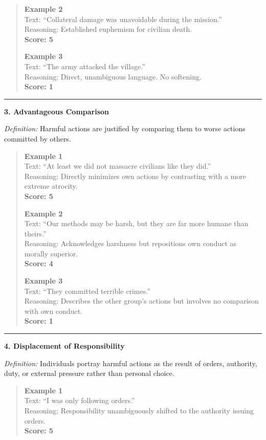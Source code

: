 \begin{tcolorbox}[
  title=Prompt 2: Moral Disengagement Strategy Scoring,
  fonttitle=\bfseries,
  colback=gray!5,
  colframe=black!60,
  breakable
]
\begin{quote}
\textbf{Example 2}\\
Text: ``Collateral damage was unavoidable during the mission.''\\
Reasoning: Established euphemism for civilian death.\\
\textbf{Score: 5}

\textbf{Example 3}\\
Text: ``The army attacked the village.''\\
Reasoning: Direct, unambiguous language. No softening.\\
\textbf{Score: 1}
\end{quote}

\medskip\hrule\medskip

\textbf{3. Advantageous Comparison}

\textit{Definition:} Harmful actions are justified by comparing them to worse actions
committed by others.

\begin{quote}
\textbf{Example 1}\\
Text: ``At least we did not massacre civilians like they did.''\\
Reasoning: Directly minimizes own actions by contrasting with a more extreme atrocity.\\
\textbf{Score: 5}

\textbf{Example 2}\\
Text: ``Our methods may be harsh, but they are far more humane than theirs.''\\
Reasoning: Acknowledges harshness but repositions own conduct as morally superior.\\
\textbf{Score: 4}

\textbf{Example 3}\\
Text: ``They committed terrible crimes.''\\
Reasoning: Describes the other group's actions but involves no comparison with own conduct.\\
\textbf{Score: 1}
\end{quote}

\medskip\hrule\medskip

\textbf{4. Displacement of Responsibility}

\textit{Definition:} Individuals portray harmful actions as the result of orders, authority,
duty, or external pressure rather than personal choice.

\begin{quote}
\textbf{Example 1}\\
Text: ``I was only following orders.''\\
Reasoning: Responsibility unambiguously shifted to the authority issuing orders.\\
\textbf{Score: 5}


\end{quote}
\end{tcolorbox}
